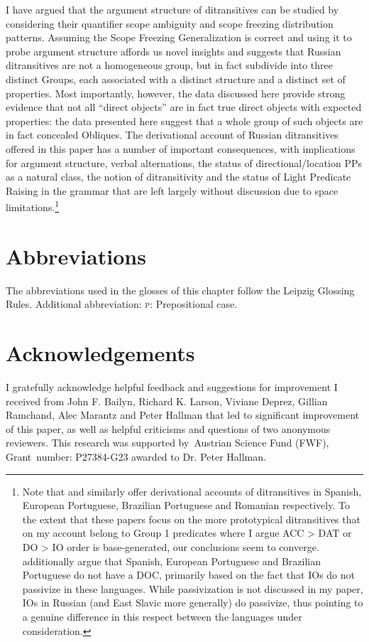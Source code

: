 \documentclass[output=paper,colorlinks,citecolor=brown,modfonts,nonflat]{langsci/langscibook}
\begin{document}
I have argued that the argument structure of ditransitives can be studied by considering their quantifier scope ambiguity and scope freezing distribution patterns. Assuming the Scope Freezing Generalization is correct and using it to probe argument structure affords us novel insights and suggests that Russian ditransitives are not a homogeneous group, but in fact subdivide into three distinct Groups, each associated with a distinct structure and a distinct set of properties. Most importantly, however, the data discussed here provide strong evidence that not all “direct objects” are in fact true direct objects with expected properties: the data presented here suggest that a whole group of such objects are in fact concealed Obliques. The derivational account of Russian ditransitives offered in this paper has a number of important consequences, with implications for argument structure, verbal alternations, the status of directional/location PPs as a natural class, the notion of ditransitivity and the status of Light Predicate Raising in the grammar that are left largely without discussion due to space limitations.\footnote{Note that  and  similarly offer derivational accounts of ditransitives in Spanish, European Portuguese, Brazilian Portuguese and Romanian respectively. To the extent that these papers focus on the more prototypical ditransitives that on my account belong to Group 1 predicates where I argue ACC > DAT or DO > IO order is base-generated, our conclusions seem to converge.  additionally argue that Spanish, European Portuguese and Brazilian Portuguese do not have a DOC, primarily based on the fact that IOs do not passivize in these languages. While passivization is not discussed in my paper, IOs in Russian (and East Slavic more generally) do passivize, thus pointing to a genuine difference in this respect between the languages under consideration.}


\section*{Abbreviations}
The abbreviations used in the glosses of this chapter follow the Leipzig Glossing Rules. Additional abbreviation: \textsc{p}: Prepositional case.

\section*{Acknowledgements}
I gratefully acknowledge helpful feedback and suggestions for improvement I received from John F. Bailyn, Richard K. Larson, Viviane Deprez, Gillian Ramchand, Alec Marantz and Peter Hallman that led to significant improvement of this paper, as well as helpful criticisms and questions of two anonymous reviewers. This research was supported by~Austrian Science Fund (FWF), Grant~number: P27384-G23 awarded to Dr. Peter Hallman.

\sloppy
\printbibliography[heading=subbibliography,notkeyword=this]
\end{document}

